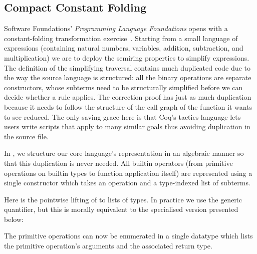 \subsection{Compact Constant Folding}
\label{sec:design:constants}

Software Foundations' \emph{Programming Language Foundations}
opens with a constant-folding transformation exercise~\cite[Chapter~1]{Pierce:SF2}.
%
Starting from a small language of expressions (containing natural numbers, variables, addition, subtraction, and multiplication) we are to deploy the semiring properties to simplify expressions.
%
The definition of the simplifying traversal contains much duplicated code due to the way the source language is structured:
%
all the binary operations are separate constructors, whose subterms need to be structurally simplified before we can decide whether a rule applies.
%
The correction proof has just as much duplication because it needs to follow the structure of the call graph of the function it wants to see reduced.
%
The only saving grace here is that Coq's tactics language lets users write scripts that apply to many similar goals thus avoiding duplication in the source file.

In \Velo{}, we structure our core language's representation in an algebraic
manner so that this duplication is never needed.
%
All builtin operators (from primitive operations on builtin types to function
application itself) are represented using a single  constructor
which takes an operation and a type-indexed list of subterms.



Here  is the pointwise lifting of  to lists
of types. In practice we use the generic  quantifier, but this
is morally equivalent to the specialised version presented below:


The primitive operations can now be enumerated in a single datatype
 which lists the primitive operation's arguments and
the associated return type.

\begin{comment}
\IdrisData{Zero}---which takes no argument and returns a term of type \IdrisData{TyNat};
%
\IdrisData{Inc}---which takes an argument of type \IdrisData{TyNat} and returns a term
of type \IdrisData{TyNat};
%
and
%
\IdrisData{App}---which takes a function and an argument that corresponds to the type of the function's domain and returns a term that is the type of the function's co-domain.
\end{comment}

